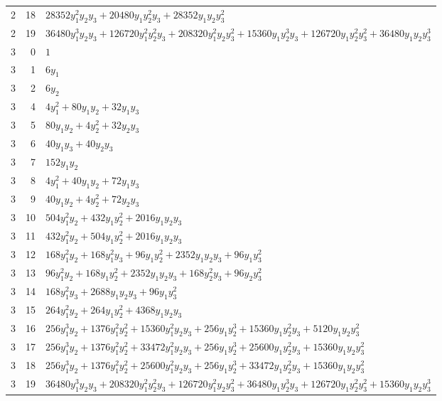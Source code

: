 \documentclass[10pt,a4paper]{article}
\begin{document}
{\begin{longtable}{rrp{125mm}}
2 & 18 & $28352 y_{1}^{2} y_{2} y_{3} + 20480 y_{1} y_{2}^{2} y_{3} + 28352 y_{1} y_{2} y_{3}^{2}$\\
2 & 19 & $36480 y_{1}^{3} y_{2} y_{3} + 126720 y_{1}^{2} y_{2}^{2} y_{3} + 208320 y_{1}^{2} y_{2} y_{3}^{2} + 15360 y_{1} y_{2}^{3} y_{3} + 126720 y_{1} y_{2}^{2} y_{3}^{2} + 36480 y_{1} y_{2} y_{3}^{3}$\\
3 & 0 & $1$\\
3 & 1 & $6 y_{1}$\\
3 & 2 & $6 y_{2}$\\
3 & 4 & $4 y_{1}^{2} + 80 y_{1} y_{2} + 32 y_{1} y_{3}$\\
3 & 5 & $80 y_{1} y_{2} + 4 y_{2}^{2} + 32 y_{2} y_{3}$\\
3 & 6 & $40 y_{1} y_{3} + 40 y_{2} y_{3}$\\
3 & 7 & $152 y_{1} y_{2}$\\
3 & 8 & $4 y_{1}^{2} + 40 y_{1} y_{2} + 72 y_{1} y_{3}$\\
3 & 9 & $40 y_{1} y_{2} + 4 y_{2}^{2} + 72 y_{2} y_{3}$\\
3 & 10 & $504 y_{1}^{2} y_{2} + 432 y_{1} y_{2}^{2} + 2016 y_{1} y_{2} y_{3}$\\
3 & 11 & $432 y_{1}^{2} y_{2} + 504 y_{1} y_{2}^{2} + 2016 y_{1} y_{2} y_{3}$\\
3 & 12 & $168 y_{1}^{2} y_{2} + 168 y_{1}^{2} y_{3} + 96 y_{1} y_{2}^{2} + 2352 y_{1} y_{2} y_{3} + 96 y_{1} y_{3}^{2}$\\
3 & 13 & $96 y_{1}^{2} y_{2} + 168 y_{1} y_{2}^{2} + 2352 y_{1} y_{2} y_{3} + 168 y_{2}^{2} y_{3} + 96 y_{2} y_{3}^{2}$\\
3 & 14 & $168 y_{1}^{2} y_{3} + 2688 y_{1} y_{2} y_{3} + 96 y_{1} y_{3}^{2}$\\
3 & 15 & $264 y_{1}^{2} y_{2} + 264 y_{1} y_{2}^{2} + 4368 y_{1} y_{2} y_{3}$\\
3 & 16 & $256 y_{1}^{3} y_{2} + 1376 y_{1}^{2} y_{2}^{2} + 15360 y_{1}^{2} y_{2} y_{3} + 256 y_{1} y_{2}^{3} + 15360 y_{1} y_{2}^{2} y_{3} + 5120 y_{1} y_{2} y_{3}^{2}$\\
3 & 17 & $256 y_{1}^{3} y_{2} + 1376 y_{1}^{2} y_{2}^{2} + 33472 y_{1}^{2} y_{2} y_{3} + 256 y_{1} y_{2}^{3} + 25600 y_{1} y_{2}^{2} y_{3} + 15360 y_{1} y_{2} y_{3}^{2}$\\
3 & 18 & $256 y_{1}^{3} y_{2} + 1376 y_{1}^{2} y_{2}^{2} + 25600 y_{1}^{2} y_{2} y_{3} + 256 y_{1} y_{2}^{3} + 33472 y_{1} y_{2}^{2} y_{3} + 15360 y_{1} y_{2} y_{3}^{2}$\\
3 & 19 & $36480 y_{1}^{3} y_{2} y_{3} + 208320 y_{1}^{2} y_{2}^{2} y_{3} + 126720 y_{1}^{2} y_{2} y_{3}^{2} + 36480 y_{1} y_{2}^{3} y_{3} + 126720 y_{1} y_{2}^{2} y_{3}^{2} + 15360 y_{1} y_{2} y_{3}^{3}$\\

\end{longtable}}
\end{document}
